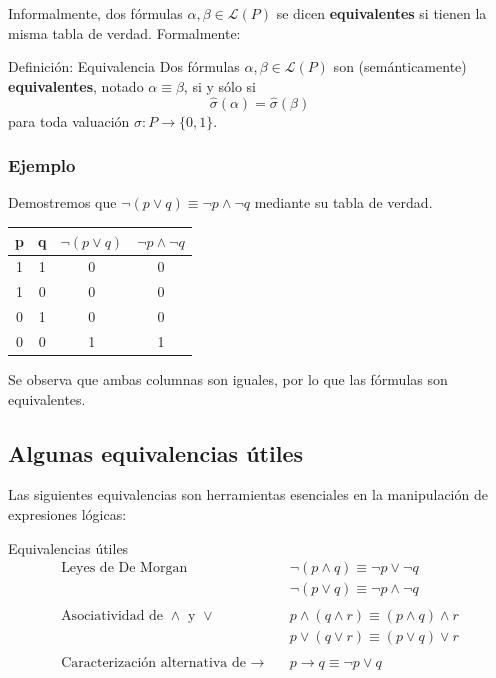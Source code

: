 Informalmente, dos fórmulas $\alpha,\beta \in \mathcal{L}(P)$ se dicen \textbf{equivalentes} si tienen la misma tabla de verdad. Formalmente:

\begin{thmblock}{Definición: Equivalencia}
Dos fórmulas $\alpha,\beta \in \mathcal{L}(P)$ son (semánticamente) \textbf{equivalentes}, notado $\alpha \equiv \beta$, si y sólo si $$ \hat{\sigma}(\alpha) = \hat{\sigma}(\beta)$$ para toda valuación $\sigma \colon P \rightarrow \{0,1\}$.
\end{thmblock}

\subsubsection*{Ejemplo}

Demostremos que $\lnot(p \lor q) \equiv \lnot p \land \lnot q$ mediante su tabla de verdad.

\begin{center} 
\begin{tabular}{|c|c||c|c|}
\hline 
p & q  &  $\lnot(p \lor q)$ & $ \lnot p \land \lnot q $ \\\hline 
1 &  1 &   0  &  0 \\\hline 
1 & 0 &  0  & 0  \\\hline 
0 & 1 &  0  & 0  \\\hline 
0 & 0 &  1  & 1  \\\hline 
\end{tabular}
\end{center}

Se observa que ambas columnas son iguales, por lo que las fórmulas son equivalentes.

\subsection{Algunas equivalencias útiles}

Las siguientes equivalencias son herramientas esenciales en la manipulación de expresiones lógicas:

\begin{thmblock}{Equivalencias útiles}
\begin{align*}     
\text{Leyes de De Morgan} \quad & \neg (p \wedge q)  \equiv  \neg p \vee \neg q \\
& \neg (p \vee q)  \equiv  \neg p \wedge \neg q \\
\\
\text{Asociatividad de } \wedge \text{ y } \vee \quad & p \wedge (q \wedge r)  \equiv  (p \wedge q) \wedge r\\
& p \vee (q \vee r) \equiv (p \vee q) \vee r\\
\\
\text{Caracterización alternativa de } \rightarrow \quad & p \rightarrow q  \equiv  \neg p \vee q
\end{align*}
\end{thmblock}


